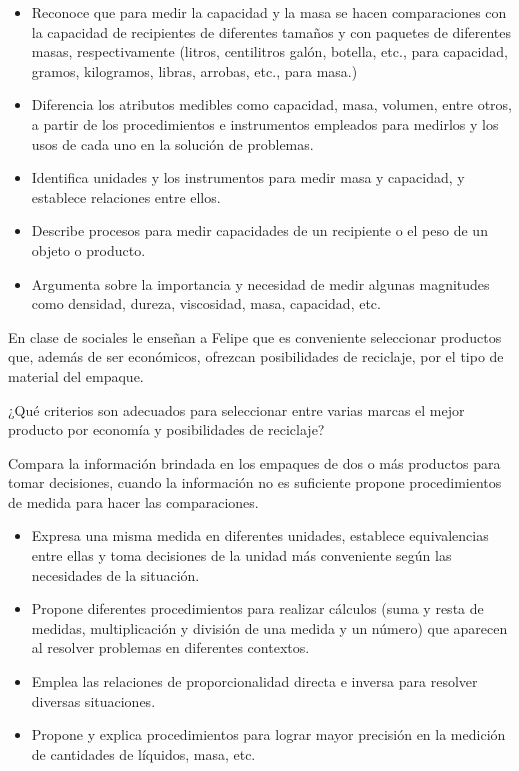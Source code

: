 \begin{itemize}
  \item Reconoce que para medir la capacidad y la masa se hacen comparaciones con la capacidad de recipientes de diferentes tamaños y con paquetes de diferentes masas, respectivamente (litros, centilitros galón, botella, etc., para capacidad, gramos, kilogramos, libras, arrobas, etc., para masa.)
  \item Diferencia los atributos medibles como capacidad, masa, volumen, entre otros, a partir de los procedimientos e instrumentos empleados para medirlos y los usos de cada uno en la solución de problemas.
  \item Identifica unidades y los instrumentos para medir masa y capacidad, y establece relaciones entre ellos.
  \item Describe procesos para medir capacidades de un recipiente o el peso de un objeto o producto.
  \item Argumenta sobre la importancia y necesidad de medir algunas magnitudes como densidad, dureza, viscosidad, masa, capacidad, etc.
\end{itemize}

\ejemplo

En clase de sociales le enseñan a Felipe que es conveniente seleccionar productos que, además de ser económicos, ofrezcan posibilidades de reciclaje, por el tipo de material del empaque.

¿Qué criterios son adecuados para seleccionar entre varias marcas el mejor producto por economía y posibilidades de reciclaje?

Compara la información brindada en los empaques de dos o más productos para tomar decisiones, cuando la información no es suficiente propone procedimientos de medida para hacer las comparaciones.



\evidencias

\begin{itemize}
  \item Expresa una misma medida en diferentes unidades, establece equivalencias entre ellas y toma decisiones de la unidad más conveniente según las necesidades de la situación.
  \item Propone diferentes procedimientos para realizar cálculos (suma y resta de medidas, multiplicación y división de una medida y un número) que aparecen al resolver problemas en diferentes contextos.
  \item Emplea las relaciones de proporcionalidad directa e inversa para resolver diversas situaciones.
  \item Propone y explica procedimientos para lograr mayor precisión en la medición de cantidades de líquidos, masa, etc.
\end{itemize}

